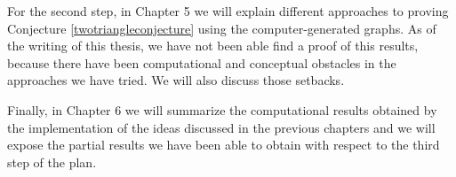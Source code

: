 For the second step, in Chapter 5 we will explain different approaches to proving Conjecture 
\ref{twotriangleconjecture} using the computer-generated graphs. As of the writing of this thesis,
we have not been able find a proof of this results, because there have been computational and
conceptual obstacles in the approaches we have tried. We will also discuss those setbacks.

Finally, in Chapter 6 we will summarize the computational results obtained by the implementation
of the ideas discussed in the previous chapters and we will expose the partial results we 
have been able to obtain with respect to the third step of the plan. 



 
